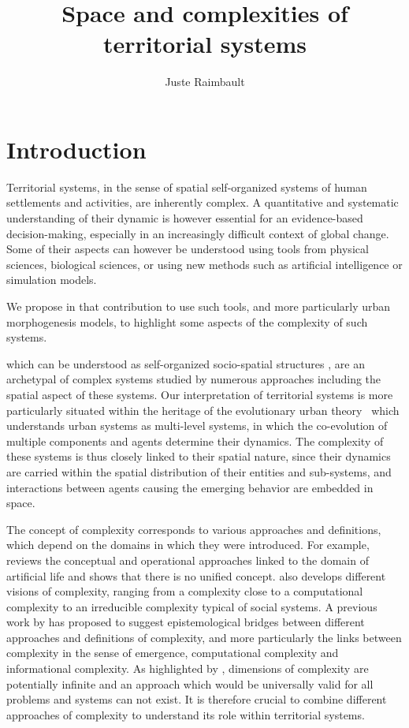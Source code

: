 \documentclass[fleqn,10pt]{wlscirep}
\title{Space and complexities of territorial systems}
\author[1,2,3,*]{Juste Raimbault}
\affil[1]{CASA, UCL, London, UK}
\affil[2]{UPS CNRS 3611 ISC-PIF, Paris, France}
\affil[*]{juste.raimbault@polytechnique.edu}
\begin{document}
\flushbottom
\maketitle

\thispagestyle{empty}


\section*{Introduction}


Territorial systems, in the sense of spatial self-organized systems of human settlements and activities, are inherently complex. A quantitative and systematic understanding of their dynamic is however essential for an evidence-based decision-making, especially in an increasingly difficult context of global change\cite{}. Some of their aspects can however be understood using tools from physical sciences\cite{}, biological sciences\cite{tero2010rules}, or using new methods such as artificial intelligence\cite{} or simulation models\cite{pumain2017urban}.

We propose in that contribution to use such tools, and more particularly urban morphogenesis models, to highlight some aspects of the complexity of such systems.

 which can be understood as self-organized socio-spatial structures  \cite{pumain1997pour}, are an archetypal of complex systems studied by numerous approaches including the spatial aspect of these systems. Our interpretation of territorial systems is more particularly situated within the heritage of the evolutionary urban theory~\cite{pumain2018evolutionary} which understands urban systems as multi-level systems, in which the co-evolution of multiple components and agents determine their dynamics\cite{raimbault2018caracterisation}. The complexity of these systems is thus closely linked to their spatial nature, since their dynamics are carried within the spatial distribution of their entities and sub-systems, and interactions between agents causing the emerging behavior are embedded in space.


The concept of complexity corresponds to various approaches and definitions, which depend on the domains in which they were introduced. For example, \cite{chu2008criteria} reviews the conceptual and operational approaches linked to the domain of artificial life and shows that there is no unified concept. \cite{deffuant2015visions} also develops different visions of complexity, ranging from a complexity close to a computational complexity to an irreducible complexity typical of social systems. A previous work by \cite{raimbault2018relating} has proposed to suggest epistemological bridges between different approaches and definitions of complexity, and more particularly the links between complexity in the sense of emergence, computational complexity and informational complexity. As highlighted by \cite{batty2018defining}, dimensions of complexity are potentially infinite and an approach which would be universally valid for all problems and systems can not exist. It is therefore crucial to combine different approaches of complexity to understand its role within territorial systems.
\end{document}

